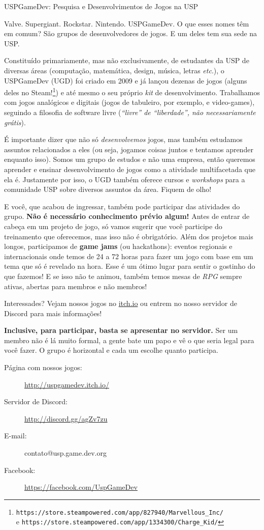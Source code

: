 \begin{subsecao}{USPGameDev: Pesquisa e Desenvolvimentos de Jogos na USP}


Valve. Supergiant. Rockstar. Nintendo. USPGameDev. O que esses nomes têm em
comum? São grupos de desenvolvedores de jogos. E um deles tem sua sede na USP.

Constituído primariamente, mas não exclusivamente, de estudantes da USP de
diversas áreas (computação, matemática, design, música, letras \textit{etc}.),
o USPGameDev (UGD) foi criado em 2009 e já lançou dezenas de jogos (alguns
deles no Steam!\footnote{\texttt{https://store.steampowered.com/app/827940/Marvellous\_Inc/}
\\ e \texttt{https://store.steampowered.com/app/1334300/Charge\_Kid/}}) e até
mesmo o seu próprio \textit{kit} de desenvolvimento. Trabalhamos com jogos
analógicos e digitais (jogos de tabuleiro, por exemplo, e video-games),
seguindo a filosofia de software livre (\textit{``livre'' de ``liberdade'',
não necessariamente grátis}).

É importante dizer que não só \textit{desenvolvemos} jogos, mas também
estudamos assuntos relacionados a eles (ou seja, jogamos coisas juntos e
tentamos aprender enquanto isso). Somos um grupo de estudos e não uma empresa,
então queremos aprender e ensinar desenvolvimento de jogos como a atividade
multifacetada que ela é. Justamente por isso, o UGD também oferece cursos e
\textit{workshops} para a comunidade USP sobre diversos assuntos da área.
Fiquem de olho!

E você, que acabou de ingressar, também pode participar das atividades do grupo.
\textbf{Não é necessário conhecimento prévio algum!} Antes de entrar de cabeça
em um projeto de jogo, só vamos sugerir que você participe do treinamento que
oferecemos, mas isso não é obrigatório. Além dos projetos mais longos,
participamos de \textbf{game jams} (ou hackathons): eventos regionais e
internacionais onde temos de 24 a 72 horas para fazer um jogo com base em um
tema que só é revelado na hora. Esse é um ótimo lugar para sentir o gostinho
do que fazemos! E se isso não te animou, também temos mesas de \textit{RPG}
sempre ativas, abertas para membros e não membros!

Interessades? Vejam nossos jogos no \url{itch.io} ou entrem no nosso servidor
de Discord para mais informações!

\textbf{Inclusive, para participar, basta se apresentar no servidor.} 
Ser um membro não é lá muito formal, a gente bate um papo e vê 
o que seria legal para você fazer. O grupo é horizontal e cada 
um escolhe quanto participa.

\begin{description}
  \item[Página com nossos jogos:] \url{http://uspgamedev.itch.io/}
  \item[Servidor de Discord:] \url{http://discord.gg/agZv7zu}
  \item[E-mail:] contato@usp.game.dev.org
  \item[Facebook:] \url{https://facebook.com/UspGameDev}
\end{description}

\end{subsecao}
